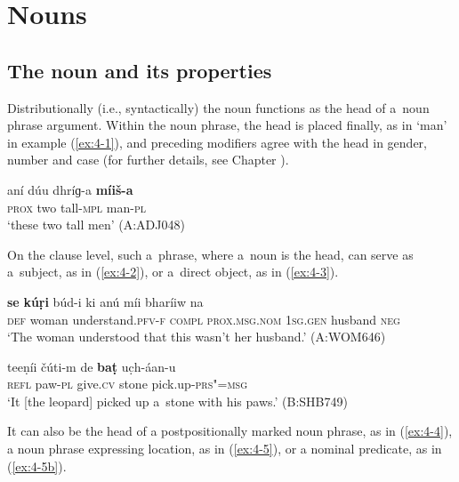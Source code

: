 \chapter{Nouns}
\label{chap:4}

\section{The noun and its properties}
\label{sec:4-1}


Distributionally (i.e., syntactically) the noun functions as the head of a~noun phrase argument. Within the noun phrase, the head is placed finally, as in `man' in example (\ref{ex:4-1}), and preceding modifiers agree with the head in gender, number and case (for further details, see Chapter ).


\begin{exe}
\ex
\label{ex:4-1}
\gll aní dúu dhríɡ-a \textbf{míiš-a} \\
	\textsc{prox} two tall-\textsc{mpl} man-\textsc{pl} \\
\glt `these two tall men' (A:ADJ048)
\end{exe}

On the clause level, such a~phrase, where a~noun is the head, can serve as a~subject, as in (\ref{ex:4-2}), or a~direct object, as in (\ref{ex:4-3}).

\begin{exe}
\ex
\label{ex:4-2}
\gll \textbf{se} \textbf{kúṛi} búd-i ki anú míi bharíiw na\\
	\textsc{def} woman understand.\textsc{pfv-f} \textsc{compl} \textsc{prox.msg.nom} \textsc{1sg.gen} husband \textsc{neg}\\
\glt `The woman understood that this wasn't her husband.' (A:WOM646)

\ex
\label{ex:4-3}
\gll teeṇíi čúti-m de \textbf{baṭ} uc̣h-áan-u \\
	\textsc{refl} paw-\textsc{pl} give.\textsc{cv} stone pick.up-\textsc{prs"=msg} \\
\glt `It [the leopard] picked up a~stone with his paws.' (B:SHB749)
\end{exe}

It can also be the head of a postpositionally marked noun phrase, as in (\ref{ex:4-4}), a noun phrase expressing location, as in (\ref{ex:4-5}), or a nominal predicate, as in (\ref{ex:4-5b}).

